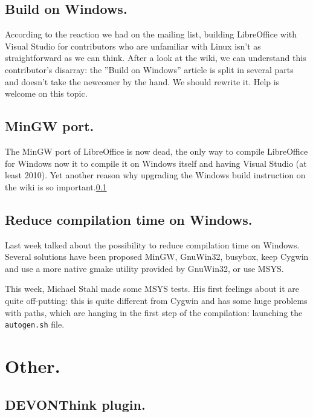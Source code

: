 \documentclass{article}
\begin{document}
\subsection{Build on Windows.}

\label{fixWindowsBuildInstructions}
According to the reaction we had on the mailing list, building LibreOffice with Visual Studio for contributors who are unfamiliar with Linux isn't as straightforward as we can think\cite{visualStudioProject}. After a look at the wiki, we can understand this contributor's disarray: the ''Build on Windows'' article\cite{windowsBuildMess} is split in several parts and doesn't take the newcomer by the hand. We should rewrite it. Help is welcome on this topic.

\subsection{MinGW port.}

The MinGW port of LibreOffice is now dead\cite{mingwDead}, the only way to compile LibreOffice for Windows now it to compile it on Windows itself and having Visual Studio (at least 2010). Yet another reason why upgrading the Windows build instruction on the wiki is so important.\ref{fixWindowsBuildInstructions} 

\subsection{Reduce compilation time on Windows.}

Last week talked about the possibility to reduce compilation time on Windows. Several solutions have been proposed MinGW, GnuWin32, busybox, keep Cygwin and use a more native gmake utility provided by GnuWin32, or use MSYS. 

This week, Michael Stahl made some MSYS tests. His first feelings about it are quite off-putting: this is quite different from Cygwin and has some huge problems with paths, which are hanging in the first step of the compilation: launching the \lstinline|autogen.sh| file\cite{msysTest}.



\section{Other.}

\subsection{DEVONThink plugin.}
\end{document}
